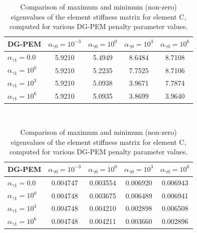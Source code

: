 \begin{table}
\centering
\begin{subtable}{1.0\textwidth}
\centering
\begin{tabular}{| l || c | c | c | c |}
    \hline
DG-PEM & $\alpha_{\gamma0} = 10^{-3}$ & $\alpha_{\gamma0} = 10^{0}$ & $\alpha_{\gamma0} = 10^{3}$ & $\alpha_{\gamma0} = 10^{6}$ \\ \hline \hline
$\alpha_{\gamma1} = 0.0$	& 5.9210 & 5.4949 & 8.6484 & 8.7108 \\ \hline
$\alpha_{\gamma1} = 10^{0}$ & 5.9210 & 5.2235 & 7.7525 & 8.7106 \\ \hline
$\alpha_{\gamma1} = 10^{3}$ & 5.9210 & 5.0938 & 3.9671 & 7.7874 \\ \hline
$\alpha_{\gamma1} = 10^{6}$ & 5.9210 & 5.0935 & 3.8699 & 3.9640 \\
    \hline
    \end{tabular}
    \caption{Largest eigenvalue: $\lambda_{\max}$}
    \label{tab:concave_stiffness_max_eigenvalue_parameter_study}
\end{subtable}%
\\
\begin{subtable}{1.0\textwidth}
\centering
\begin{tabular}{| l || c | c | c | c |}
    \hline
DG-PEM & $\alpha_{\gamma0} = 10^{-3}$	&	$\alpha_{\gamma0} = 10^{0}$	&	$\alpha_{\gamma0} = 10^{3}$	&	$\alpha_{\gamma0} = 10^{6}$ \\ \hline \hline
$\alpha_{\gamma1} = 0.0$	&	0.004747	&	0.003554	&	0.006920	&	0.006943 \\ \hline
$\alpha_{\gamma1} = 10^{0}$	&	0.004748	&	0.003675	&	0.006489	&	0.006941 \\ \hline
$\alpha_{\gamma1} = 10^{3}$	&	0.004748	&	0.004210	&	0.002898	&	0.006508 \\ \hline
$\alpha_{\gamma1} = 10^{6}$	&	0.004748	&	0.004211	&	0.003660	&	0.002896 \\
    \hline
    \end{tabular}
    \caption{Smallest (non-zero) eigenvalue: $\lambda_{\min}$}
    \label{tab:concave_stiffness_min_eigenvalue_parameter_study}
\end{subtable}

\caption{Comparison of maximum and minimum (non-zero) eigenvalues of the element stiffness matrix for element C, computed for various DG-PEM penalty parameter values.}
\label{tab:concave_stiffness_max_min_eigenvalue_parameter_study}
\end{table}

